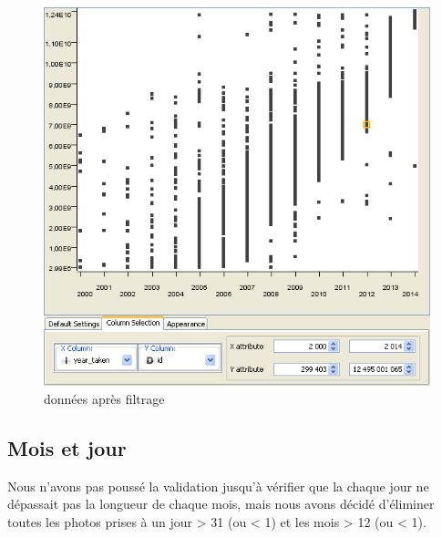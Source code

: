         \begin{figure}[h]
            \centering
            \includegraphics[scale=0.35]{../screenshots/year_id_after.png}
            \caption{données apr\`es filtrage}
            \label{diagram:year_id_after}
        \end{figure}

    \pagebreak
    \subsection{Mois et jour}

        Nous n'avons pas poussé la validation jusqu'à vérifier que la chaque jour ne dépassait pas la longueur de chaque mois, mais nous avons décidé d'éliminer toutes les photos prises à un jour > 31 (ou < 1) et les mois > 12 (ou < 1).

